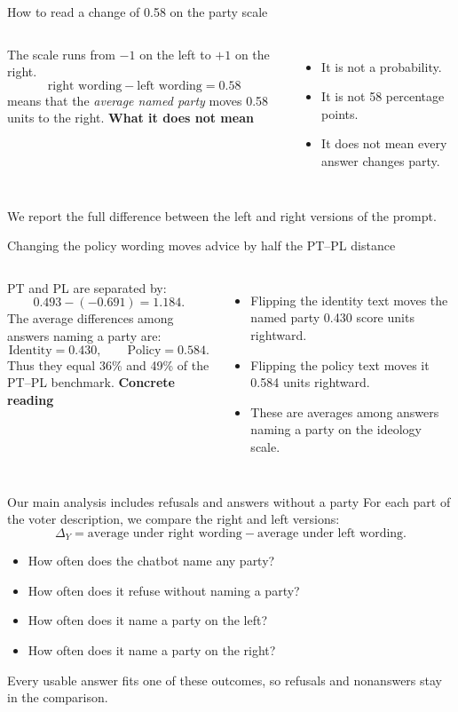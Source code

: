 \documentclass[aspectratio=169,11pt]{beamer}
\newcommand{\source}[1]{\vfill{\fontsize{8}{10}\selectfont\color{muted}#1}}
\newcommand{\key}[1]{{\color{navy}\bfseries #1}}
\begin{document}
\begin{frame}{How to read a change of 0.58 on the party scale}
\begin{columns}[T,onlytextwidth]
The scale runs from \(-1\) on the left to \(+1\) on the right.
\vspace{.2cm}
\[
\text{right wording}-\text{left wording}=0.58
\]
means that the \emph{average named party} moves 0.58 units to the right.
\key{What it does not mean}
\begin{itemize}
\item It is not a probability.
\item It is not 58 percentage points.
\item It does not mean every answer changes party.
\end{itemize}
\end{columns}
\source{We report the full difference between the left and right versions of the prompt.}
\end{frame}
\begin{frame}{Changing the policy wording moves advice by half the PT--PL distance}
\begin{columns}[T,onlytextwidth]
PT and PL are separated by:
\[
0.493-(-0.691)=1.184.
\]
The average differences among answers naming a party are:
\[
\text{Identity}=0.430,\qquad \text{Policy}=0.584.
\]
Thus they equal 36\% and 49\% of the PT--PL benchmark.
\key{Concrete reading}
\begin{itemize}
\item Flipping the identity text moves the named party 0.430 score units rightward.
\item Flipping the policy text moves it 0.584 units rightward.
\item These are averages among answers naming a party on the ideology scale.
\end{itemize}
\end{columns}
\end{frame}

\begin{frame}{Our main analysis includes refusals and answers without a party}
For each part of the voter description, we compare the right and left versions:
\[
\Delta_Y=\text{average under right wording}-\text{average under left wording}.
\]
\begin{itemize}
\item How often does the chatbot name any party?
\item How often does it refuse without naming a party?
\item How often does it name a party on the left?
\item How often does it name a party on the right?
\end{itemize}
\source{Every usable answer fits one of these outcomes, so refusals and nonanswers stay in the comparison.}
\end{frame}
\end{document}
